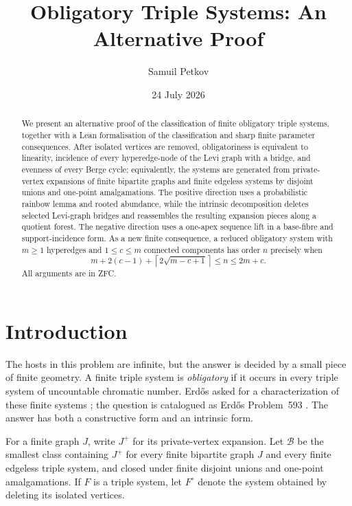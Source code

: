 \documentclass[a4paper,11pt,reqno]{amsart}
\title[Obligatory triple systems]{Obligatory Triple Systems: An Alternative Proof}
\author{Samuil Petkov}
\date{24 July 2026}
\theoremstyle{plain}
\theoremstyle{definition}
\theoremstyle{remark}
\begin{document}
\begin{abstract}
We present an alternative proof of the classification of finite obligatory
triple systems, together with a Lean formalisation of the classification and
sharp finite parameter consequences.  After isolated vertices are removed, obligatoriness is
equivalent to linearity, incidence of every hyperedge-node of the Levi graph
with a bridge, and evenness of every Berge cycle; equivalently, the systems
are generated from private-vertex expansions of finite bipartite graphs and
finite edgeless systems by disjoint unions and one-point amalgamations.  The
positive direction uses a probabilistic rainbow lemma and rooted abundance,
while the intrinsic decomposition deletes selected Levi-graph bridges and
reassembles the resulting expansion pieces along a quotient forest.  The
negative direction uses a one-apex sequence lift in a base-fibre and
support-incidence form.  As a new finite consequence, a reduced obligatory
system with $m\ge1$ hyperedges and $1\le c\le m$ connected components has
order $n$ precisely when
\[
m+2(c-1)+\left\lceil2\sqrt{m-c+1}\right\rceil
\le n\le 2m+c.
\]
All arguments are in ZFC.
\end{abstract}

\maketitle

\section*{Introduction}\label{introduction}

The hosts in this problem are infinite, but the answer is decided by a small
piece of finite geometry.  A finite triple system is \emph{obligatory} if it
occurs in every triple system of uncountable chromatic number.  Erdős asked for a characterization
of these finite systems \citep{erdos1995}; the question is catalogued as
Erdős Problem~593 \citep{bloom593}.  The answer has both a constructive form
and an intrinsic form.

For a finite graph $J$, write $J^+$ for its private-vertex expansion.  Let
$\mathcal B$ be the smallest class containing $J^+$ for every finite
bipartite graph $J$ and every finite edgeless triple system, and closed under
finite disjoint unions and one-point amalgamations.  If $F$ is a triple
system, let $F^\circ$ denote the system obtained by deleting its isolated
vertices.
\end{document}

